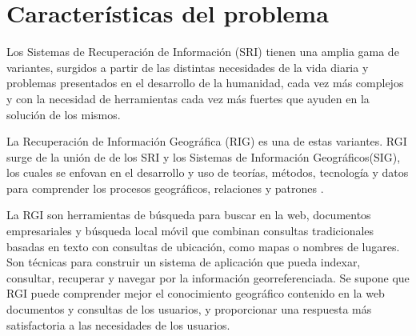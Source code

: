 \section{Características del problema}\label{sec:prob-charact}

Los Sistemas de Recuperación de Información (SRI) tienen una amplia gama de
variantes, surgidos a partir de las distintas necesidades de la vida diaria y
problemas presentados en el desarrollo de la humanidad, cada vez más complejos
y con la necesidad de herramientas cada vez más fuertes que ayuden en la
solución de los mismos. 

La Recuperación de Información Geográfica (RIG) es una de estas variantes. RGI
surge de la unión de de los SRI y los Sistemas de Información Geográficos(SIG),
los cuales se enfovan en el desarrollo y uso de teorías, métodos, tecnología y
datos para comprender los procesos geográficos, relaciones y patrones
\cite{chang2016}.


La RGI son herramientas de búsqueda para buscar en la web, documentos
empresariales y búsqueda local móvil que combinan consultas tradicionales
basadas en texto con consultas de ubicación, como mapas o nombres de lugares.
Son técnicas para construir un sistema de aplicación que pueda indexar,
consultar, recuperar y navegar por la información georreferenciada. Se supone
que RGI puede comprender mejor el conocimiento geográfico contenido en la web
documentos y consultas de los usuarios, y proporcionar una respuesta más
satisfactoria a las necesidades de los usuarios.

\newpage
